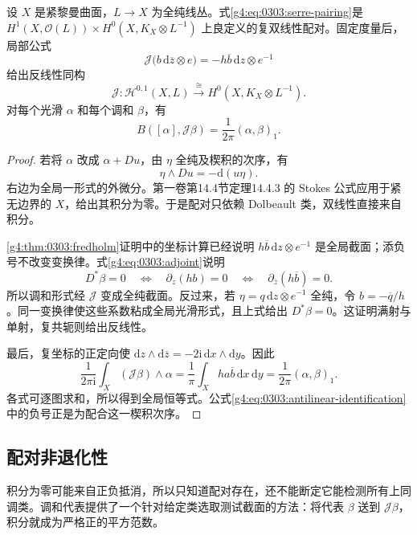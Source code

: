 \begin{proposition}
	\label{g4:prop:0303:pairing-adjoint}
	设 \(X\) 是紧黎曼曲面，\(L\to X\) 为全纯线丛。式\eqref{g4:eq:0303:serre-pairing}是 \(H^1(X,\mathcal O(L))\times H^0(X,K_X\otimes L^{-1})\) 上良定义的复双线性配对。固定度量后，局部公式
	\begin{equation}
		\label{g4:eq:0303:antilinear-identification}
		\mathcal J\bigl(b\,\mathrm{d}\overline z\otimes e\bigr)
		=-h\overline b\,\mathrm{d}z\otimes e^{-1}
	\end{equation}
	给出反线性同构
	\[
		\mathcal J:\mathscr H^{0,1}(X,L)
		\xrightarrow{\ \cong\ }H^0(X,K_X\otimes L^{-1}).
	\]
	对每个光滑 \(\alpha\) 和每个调和 \(\beta\)，有
	\begin{equation}
		\label{g4:eq:0303:pairing-inner-product}
		B([\alpha],\mathcal J\beta)=\frac1{2\pi}(\alpha,\beta)_1.
	\end{equation}
\end{proposition}
\begin{proof}
	若将 \(\alpha\) 改成 \(\alpha+Du\)，由 \(\eta\) 全纯及楔积的次序，有
	\[
		\eta\wedge Du=-\mathrm{d}(u\eta).
	\]
	右边为全局一形式的外微分。第一卷第14.4节定理14.4.3 的 Stokes 公式应用于紧无边界的 \(X\)，给出其积分为零。于是配对只依赖 Dolbeault 类，双线性直接来自积分。

	\cref{g4:thm:0303:fredholm}证明中的坐标计算已经说明 \(h\overline b\,\mathrm{d}z\otimes e^{-1}\) 是全局截面；添负号不改变变换律。式\eqref{g4:eq:0303:adjoint}说明
	\[
		D^*\beta=0
		\quad\Longleftrightarrow\quad
		\partial_z(hb)=0
		\quad\Longleftrightarrow\quad
		\partial_{\overline z}(h\overline b)=0.
	\]
	所以调和形式经 \(\mathcal J\) 变成全纯截面。反过来，若 \(\eta=q\,\mathrm{d}z\otimes e^{-1}\) 全纯，令 \(b=-\overline q/h\)。同一变换律使这些系数粘成全局光滑形式，且上式给出 \(D^*\beta=0\)。这证明满射与单射，复共轭则给出反线性。

	最后，复坐标的正定向使 \(\mathrm{d}z\wedge\mathrm{d}\overline z=-2\mathrm{i}\,\mathrm{d}x\wedge\mathrm{d}y\)。因此
	\[
		\frac1{2\pi\mathrm{i}}\int_X(\mathcal J\beta)\wedge\alpha
		=\frac1\pi\int_X h a\overline b\,\mathrm{d}x\,\mathrm{d}y
		=\frac1{2\pi}(\alpha,\beta)_1.
	\]
	各式可逐图求和，所以得到全局恒等式。公式\eqref{g4:eq:0303:antilinear-identification}中的负号正是为配合这一楔积次序。
\end{proof}

\subsection{配对非退化性}
\label{g4:subsec:0303:04}
积分为零可能来自正负抵消，所以只知道配对存在，还不能断定它能检测所有上同调类。调和代表提供了一个针对给定类选取测试截面的方法：将代表 \(\beta\) 送到 \(\mathcal J\beta\)，积分就成为严格正的平方范数。

